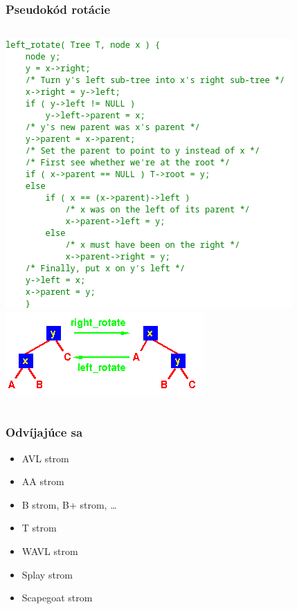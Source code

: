 \documentclass{beamer}
\begin{document}
    \begin{frame}
        \frametitle{Pseudokód rotácie}
        \begin{columns}
            \includegraphics[width=\textwidth]{code}
            \includegraphics[width=\textwidth]{rot}
        \end{columns}
    \end{frame}

    \begin{frame}
        \frametitle{Odvíjajúce sa}
        \begin{itemize}
            \item AVL strom
            \item AA strom
            \item B strom, B+ strom, \ldots
            \item T strom
            \item WAVL strom
            \item Splay strom
            \item Scapegoat strom
        \end{itemize}
    \end{frame}
\end{document}
